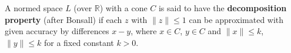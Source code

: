 A normed space $L$ (over $\mathbb{R}$) with a cone $C$ is said to have the \textbf{decomposition property} (after Bonsall) if each $z$ with $\|z\| \leq 1$ can be approximated with given accuracy by differences $x - y$, where $x \in C$, $y \in C$ and $\|x\| \leq k$, $\|y\| \leq k$ for a fixed constant $k > 0$.
